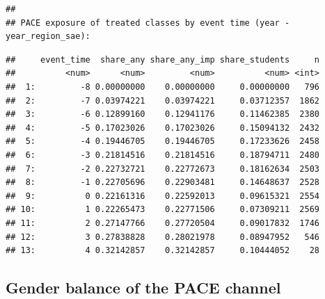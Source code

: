 \documentclass[
]{article}
\begin{document}
\begin{verbatim}
## 
## PACE exposure of treated classes by event time (year - year_region_sae):
\end{verbatim}

\begin{verbatim}
##     event_time  share_any share_any_imp share_students     n
##          <num>      <num>         <num>          <num> <int>
##  1:         -8 0.00000000    0.00000000     0.00000000   796
##  2:         -7 0.03974221    0.03974221     0.03712357  1862
##  3:         -6 0.12899160    0.12941176     0.11462385  2380
##  4:         -5 0.17023026    0.17023026     0.15094132  2432
##  5:         -4 0.19446705    0.19446705     0.17233626  2458
##  6:         -3 0.21814516    0.21814516     0.18794711  2480
##  7:         -2 0.22732721    0.22772673     0.18162634  2503
##  8:         -1 0.22705696    0.22903481     0.14648637  2528
##  9:          0 0.22161316    0.22592013     0.09615321  2554
## 10:          1 0.22265473    0.22771506     0.07309211  2569
## 11:          2 0.27147766    0.27720504     0.09017832  1746
## 12:          3 0.27838828    0.28021978     0.08947952   546
## 13:          4 0.32142857    0.32142857     0.10444052    28
\end{verbatim}

\begin{table}[htbp]
   \caption{Effect of SAE on PACE Exposure}\label{tab: pace exposure did}
   \centerline{}
\end{table}

\hypertarget{gender-balance-of-the-pace-channel}{%
\subsection{Gender balance of the PACE
channel}\label{gender-balance-of-the-pace-channel}}
\end{document}
